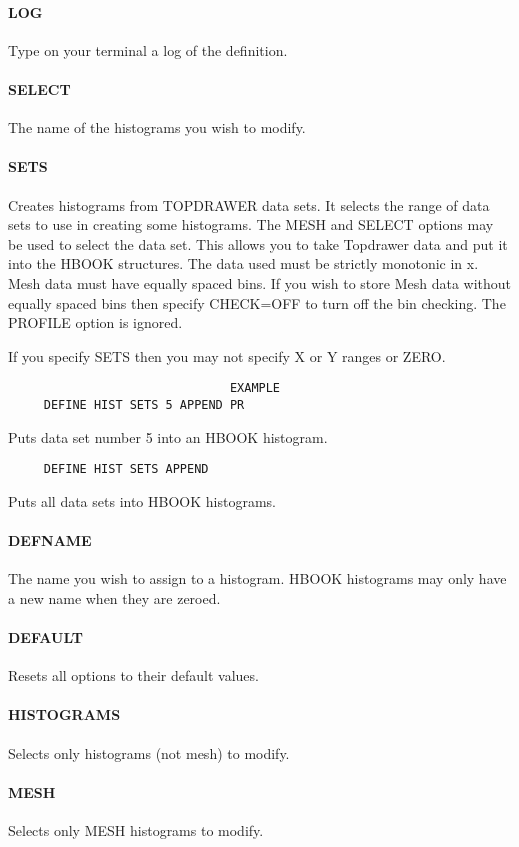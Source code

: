 \paragraph{LOG        }
Type on your terminal a log of the definition.  
\paragraph{SELECT     }
The name of the histograms you wish to modify.  
\paragraph{SETS       }
Creates histograms from TOPDRAWER data sets.  It selects the range of
data sets to use in creating some histograms.  The  MESH  and  SELECT
options  may be used to select the data set.  This allows you to take
Topdrawer data and put it into the HBOOK structures.  The  data  used
must  be strictly monotonic in x.  Mesh data must have equally spaced
bins.  If you wish to store Mesh data  without  equally  spaced  bins
then  specify  CHECK=OFF  to  turn off the bin checking.  The PROFILE
option is ignored.  

If you specify SETS then you may not specify X or Y ranges or ZERO.  
\begin{verbatim}
                               EXAMPLE
     DEFINE HIST SETS 5 APPEND PR 
\end{verbatim}
Puts data set number 5 into an HBOOK histogram.  
\begin{verbatim}
     DEFINE HIST SETS APPEND 
\end{verbatim}
Puts all data sets into HBOOK histograms.  
\paragraph{DEFNAME}
The  name  you  wish  to assign to a histogram.  HBOOK histograms may
only have a new name when they are zeroed.  
\paragraph{DEFAULT      }
Resets all options to their default values.  
\paragraph{HISTOGRAMS   }
Selects only histograms (not mesh) to modify.  
\paragraph{MESH         }
Selects only MESH histograms to modify.  
